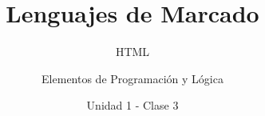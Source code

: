 \documentclass[usenames,dvipsnames]{../../common/beamerUNQ}
\title{Lenguajes de Marcado}
\subtitle{HTML}
\author{Elementos de Programación y Lógica}
\date{Unidad 1 - Clase 3}
\begin{document}
  \titleframe
  \toc
  
  \finaltitleframe
\end{document}
